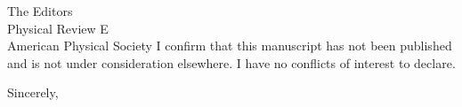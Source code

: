 \documentclass[11pt]{letter}
\begin{document}
\begin{letter}{The Editors\\Physical Review E\\American Physical Society}
I confirm that this manuscript has not been published and is not under consideration elsewhere. I have no conflicts of interest to declare.

\closing{Sincerely,}

\end{letter}
\end{document}
